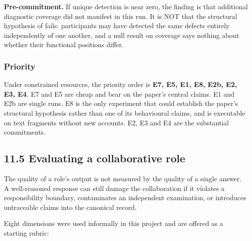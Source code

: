 \textbf{Pre-commitment.} If unique detection is near zero, the finding is that additional diagnostic coverage did not manifest in this run. It is NOT that the structural hypothesis of  fails: participants may have detected the same defects entirely independently of one another, and a null result on coverage says nothing about whether their functional positions differ.


\subsubsection*{Priority}
\label{sec:en:x-priority}

Under constrained resources, the priority order is \textbf{E7, E5, E1, E8, E2b, E2, E3, E4}. E7 and E5 are cheap and bear on the paper's central claims. E1 and E2b are single runs. E8 is the only experiment that could establish the paper's structural hypothesis rather than one of its behavioural claims, and is executable on text fragments without new accounts. E2, E3 and E4 are the substantial commitments.


\subsection*{11.5 Evaluating a collaborative role}
\label{sec:en:11.5}

The quality of a role's output is not measured by the quality of a single answer. A well-reasoned response can still damage the collaboration if it violates a responsibility boundary, contaminates an independent examination, or introduces untraceable claims into the canonical record.

Eight dimensions were used informally in this project and are offered as a starting rubric:

